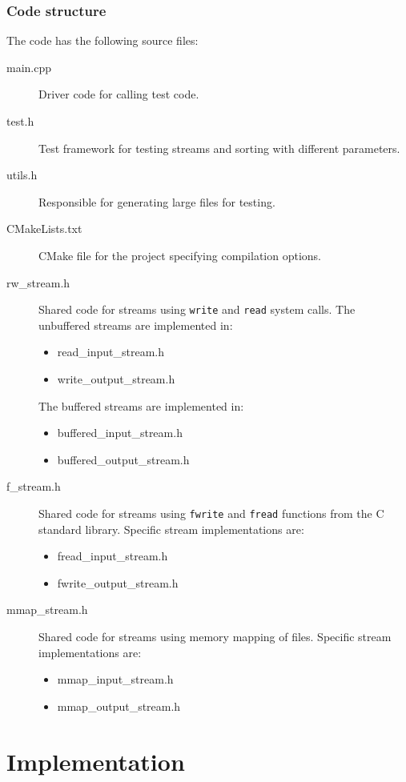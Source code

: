 \documentclass[a4paper,12pt]{article}
\begin{document}
\subsubsection{Code structure}
The code has the following source files:
\begin{description}
\item[main.cpp] Driver code for calling test code.
\item[test.h] Test framework for testing streams and sorting with
  different parameters.
\item[utils.h] Responsible for generating large files for testing.
\item[CMakeLists.txt] CMake file for the project specifying
  compilation options.

\item[rw\_stream.h] Shared code for streams using \texttt{write} and
  \texttt{read} system calls. The unbuffered streams are implemented
  in:
  \begin{itemize}
  \item read\_input\_stream.h
  \item write\_output\_stream.h
  \end{itemize}
  The buffered streams are implemented in:
  \begin{itemize}
  \item buffered\_input\_stream.h
  \item buffered\_output\_stream.h
  \end{itemize}

\item[f\_stream.h] Shared code for streams using \texttt{fwrite} and
  \texttt{fread} functions from the C standard library. Specific
  stream implementations are:
  \begin{itemize}
  \item fread\_input\_stream.h
  \item fwrite\_output\_stream.h
  \end{itemize}

\item[mmap\_stream.h] Shared code for streams using memory mapping of
  files. Specific stream implementations are:
  \begin{itemize}
  \item mmap\_input\_stream.h
  \item mmap\_output\_stream.h
  \end{itemize}
\end{description}

\section{Implementation}
\end{document}
